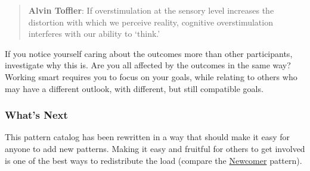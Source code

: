 \begin{quote}
\textbf{Alvin Toffler}: If overstimulation at the sensory level
increases the distortion with which we perceive reality, cognitive
overstimulation interferes with our ability to `think.'
\end{quote}

If you notice yourself caring about the outcomes more than other
participants, investigate why this is. Are you all affected by the
outcomes in the same way? Working smart requires you to focus on your
goals, while relating to others who may have a different outlook, with
different, but still compatible goals.

\subsubsection*{What's Next} This pattern catalog has been rewritten in a way
that should make it easy for anyone to add new patterns. Making it easy
and fruitful for others to get involved is one of the best ways to
redistribute the load (compare
the \href{http://peeragogy.org/practice/heuristics/newcomer/}{Newcomer}
pattern).

